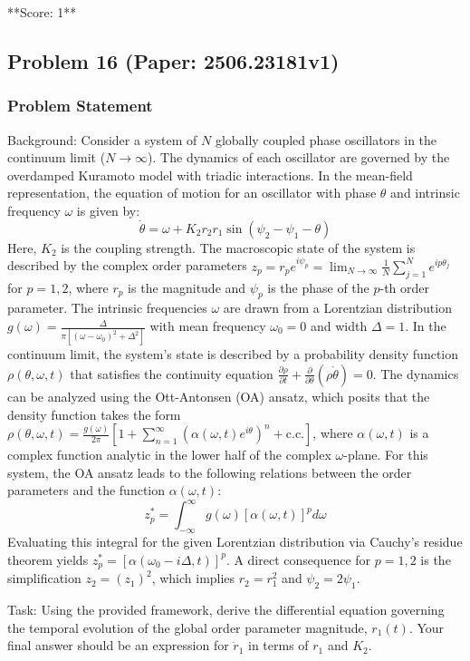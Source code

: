 \documentclass[10pt]{article}
\begin{document}
**Score: 1**

\newpage
\subsection*{Problem 16 (Paper: 2506.23181v1)}
\subsubsection*{Problem Statement}
Background:
Consider a system of $N$ globally coupled phase oscillators in the continuum limit ($N \to \infty$). The dynamics of each oscillator are governed by the overdamped Kuramoto model with triadic interactions. In the mean-field representation, the equation of motion for an oscillator with phase $\theta$ and intrinsic frequency $\omega$ is given by:
$$ \dot{\theta} = \omega + K_2 r_2 r_1 \sin(\psi_2 - \psi_1 - \theta) $$
Here, $K_2$ is the coupling strength. The macroscopic state of the system is described by the complex order parameters $z_p = r_p e^{i\psi_p} = \lim_{N\to\infty} \frac{1}{N} \sum_{j=1}^N e^{ip\theta_j}$ for $p=1,2$, where $r_p$ is the magnitude and $\psi_p$ is the phase of the $p$-th order parameter. The intrinsic frequencies $\omega$ are drawn from a Lorentzian distribution $g(\omega) = \frac{\Delta}{\pi \left[(\omega - \omega_0)^2 + \Delta^2\right]}$ with mean frequency $\omega_0 = 0$ and width $\Delta=1$. In the continuum limit, the system's state is described by a probability density function $\rho(\theta, \omega, t)$ that satisfies the continuity equation $\frac{\partial \rho}{\partial t} + \frac{\partial}{\partial \theta}(\rho \dot{\theta}) = 0$. The dynamics can be analyzed using the Ott-Antonsen (OA) ansatz, which posits that the density function takes the form $\rho(\theta, \omega, t) = \frac{g(\omega)}{2\pi} \left[ 1 + \sum_{n=1}^{\infty} (\alpha(\omega, t) e^{i\theta})^n + \text{c.c.} \right]$, where $\alpha(\omega, t)$ is a complex function analytic in the lower half of the complex $\omega$-plane. For this system, the OA ansatz leads to the following relations between the order parameters and the function $\alpha(\omega, t)$:
$$ z_p^* = \int_{-\infty}^{\infty} g(\omega) [\alpha(\omega, t)]^p d\omega $$
Evaluating this integral for the given Lorentzian distribution via Cauchy's residue theorem yields $z_p^* = [\alpha(\omega_0 - i\Delta, t)]^p$. A direct consequence for $p=1,2$ is the simplification $z_2 = (z_1)^2$, which implies $r_2 = r_1^2$ and $\psi_2 = 2\psi_1$.

Task:
Using the provided framework, derive the differential equation governing the temporal evolution of the global order parameter magnitude, $r_1(t)$. Your final answer should be an expression for $\dot{r}_1$ in terms of $r_1$ and $K_2$.
\end{document}
